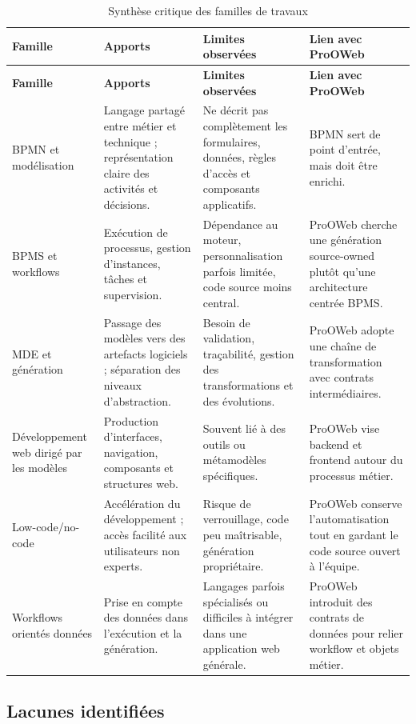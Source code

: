 \documentclass[12pt,a4paper]{article}
\begin{document}
\begin{longtable}{|p{3.2cm}|p{4.1cm}|p{4.2cm}|p{3.4cm}|}
\caption{Synthèse critique des familles de travaux}
\label{tab:synthese-familles}\\
\hline
\textbf{Famille} & \textbf{Apports} & \textbf{Limites observées} & \textbf{Lien avec ProOWeb} \\
\hline
\endfirsthead
\hline
\textbf{Famille} & \textbf{Apports} & \textbf{Limites observées} & \textbf{Lien avec ProOWeb} \\
\hline
\endhead
BPMN et modélisation & Langage partagé entre métier et technique ; représentation claire des activités et décisions. & Ne décrit pas complètement les formulaires, données, règles d'accès et composants applicatifs. & BPMN sert de point d'entrée, mais doit être enrichi. \\
\hline
BPMS et workflows & Exécution de processus, gestion d'instances, tâches et supervision. & Dépendance au moteur, personnalisation parfois limitée, code source moins central. & ProOWeb cherche une génération source-owned plutôt qu'une architecture centrée BPMS. \\
\hline
MDE et génération & Passage des modèles vers des artefacts logiciels ; séparation des niveaux d'abstraction. & Besoin de validation, traçabilité, gestion des transformations et des évolutions. & ProOWeb adopte une chaîne de transformation avec contrats intermédiaires. \\
\hline
Développement web dirigé par les modèles & Production d'interfaces, navigation, composants et structures web. & Souvent lié à des outils ou métamodèles spécifiques. & ProOWeb vise backend et frontend autour du processus métier. \\
\hline
Low-code/no-code & Accélération du développement ; accès facilité aux utilisateurs non experts. & Risque de verrouillage, code peu maîtrisable, génération propriétaire. & ProOWeb conserve l'automatisation tout en gardant le code source ouvert à l'équipe. \\
\hline
Workflows orientés données & Prise en compte des données dans l'exécution et la génération. & Langages parfois spécialisés ou difficiles à intégrer dans une application web générale. & ProOWeb introduit des contrats de données pour relier workflow et objets métier. \\
\hline
\end{longtable}

\subsection{Lacunes identifiées}
\end{document}
